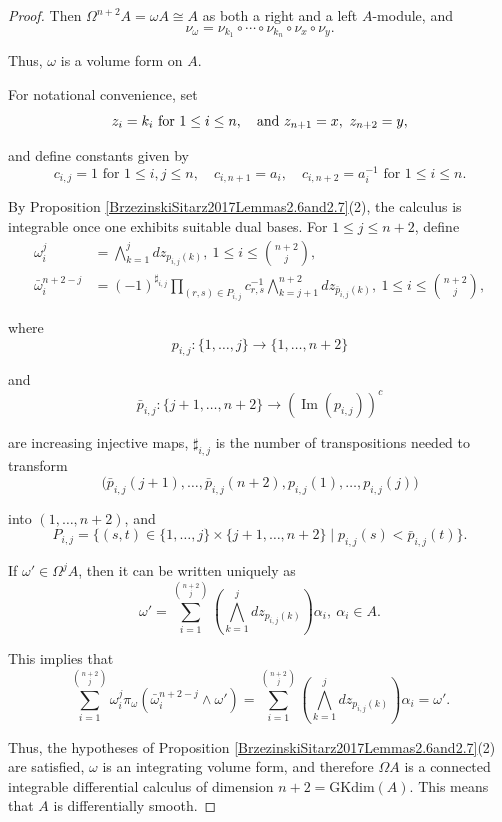 \documentclass{amsart}
\theoremstyle{definition}
\theoremstyle{remark}
\numberwithin{equation}{section}
\begin{document}
\begin{proof}
Then $\Omega^{n+2}A=\omega A \cong A$ as both a right and a left $A$-module, and
\[
\nu_{\omega} =\nu_{k_1}\circ\cdots\circ\nu_{k_n}\circ\nu_x\circ\nu_y.
\]

Thus, $\omega$ is a volume form on $A$.

For notational convenience, set
\[
z_i=k_i\text{ for } 1\leq i\leq n,\quad {\rm and} \ z_{n+1} = x, \ z_{n+2}=y,
\]

and define constants given by
\[
c_{i,j}=1 \text{ for } 1\leq i,j\leq n,\quad c_{i,n+1}=a_i,\quad c_{i,n+2}=a_i^{-1}\text{ for } 1\leq i\leq n.
\]

By Proposition \ref{BrzezinskiSitarz2017Lemmas2.6and2.7}(2), the calculus is integrable once one exhibits suitable dual bases. For $1\leq j\leq n+2$, define
\begin{align*}
\omega_i^j &= \bigwedge_{k=1}^{j} dz_{p_{i,j}(k)}, \ 1\leq i\leq \binom{n+2}{j}, \\
\bar{\omega}_i^{ n+2-j}&= (-1)^{\sharp_{i,j}}\prod_{(r,s)\in P_{i,j}} c_{r,s}^{-1} \bigwedge_{k=j+1}^{n+2} dz_{\bar p_{i,j}(k)}, \ 1\leq i\leq \binom{n+2}{j},
\end{align*}

where
\[
p_{i,j}:\{1,\ldots,j\}\to \{1,\ldots,n+2\}
\]

and
\[
\bar p_{i,j}:\{j+1,\ldots,n+2\}\to (\operatorname{Im}(p_{i,j}))^c
\]

are increasing injective maps, $\sharp_{i,j}$ is the number of transpositions needed to transform
\[
\big(\bar p_{i,j}(j+1),\ldots,\bar p_{i,j}(n+2),p_{i,j}(1),\ldots,p_{i,j}(j)\big)
\]

into $(1,\ldots,n+2)$, and
\[
P_{i,j}=\{(s,t)\in \{1,\ldots,j\}\times \{j+1,\ldots,n+2\}\mid p_{i,j}(s)<\bar p_{i,j}(t)\}.
\]

If $\omega'\in \Omega^jA$, then it can be written uniquely as
\[
\omega'=\sum_{i=1}^{\binom{n+2}{j}}\left(\bigwedge_{k=1}^{j} dz_{p_{i,j}(k)}\right)\alpha_i,\ \alpha_i\in A.
\]

This implies that 
$$
\sum_{i=1}^{\binom{n+2}{j}}\omega_i^j \pi_{\omega}\left(\bar{\omega}_i^{ n+2-j}\wedge \omega'\right) = \sum_{i=1}^{\binom{n+2}{j}}\left(\bigwedge_{k=1}^{j} dz_{p_{i,j}(k)}\right)\alpha_i = \omega'.
$$

Thus, the hypotheses of Proposition \ref{BrzezinskiSitarz2017Lemmas2.6and2.7}(2) are satisfied, $\omega$ is an integrating volume form, and therefore $\Omega A$ is a connected integrable differential calculus of dimension $n+2=\mathrm{GKdim}(A)$. This means that $A$ is differentially smooth.
\end{proof}
\end{document}
